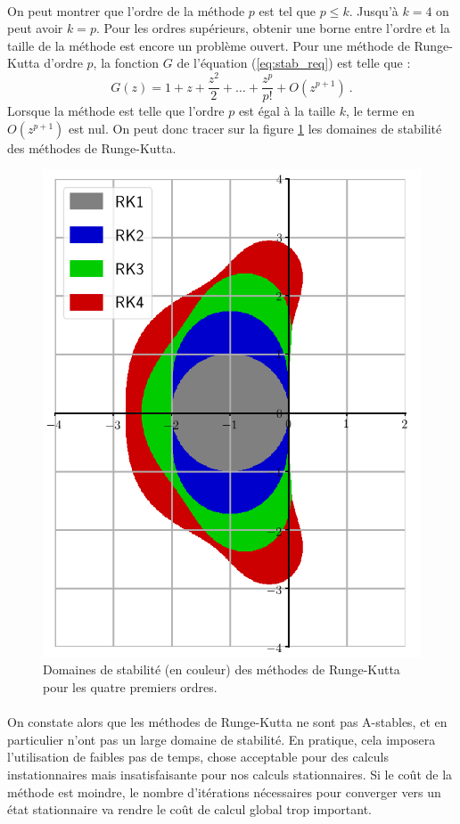     \paragraph{}
    On peut montrer que l'ordre de la méthode $p$ est tel que $p \leq k$.
    Jusqu'à $k = 4$ on peut avoir $k = p$.
    Pour les ordres supérieurs, obtenir une borne entre l'ordre et la taille de la méthode est encore un problème ouvert.
    Pour une méthode de Runge-Kutta d'ordre $p$, la fonction $G$ de l'équation (\ref{eq:stab_req}) est telle que \cite{HairerWanner1996}:
    \[G\left(z\right) = 1 + z + \frac{z^2}{2} + \dots + \frac{z^p}{p!} + O\left(z^{p+1}\right)\ .\]
    Lorsque la méthode est telle que l'ordre $p$ est égal à la taille $k$, le terme en $O\left(z^{p+1}\right)$ est nul.
    On peut donc tracer sur la figure \ref{fig:rk_stab} les domaines de stabilité des méthodes de Runge-Kutta.

    \begin{figure}
      \centering
      \includegraphics[width=.45\textwidth]{images/rk_stab.png}
      \caption{Domaines de stabilité (en couleur) des méthodes de Runge-Kutta pour les quatre premiers ordres.}
      \label{fig:rk_stab}
    \end{figure}

    \paragraph{}
    On constate alors que les méthodes de Runge-Kutta ne sont pas A-stables, et en particulier n'ont pas un large domaine de stabilité.
    En pratique, cela imposera l'utilisation de faibles pas de temps, chose acceptable pour des calculs instationnaires mais insatisfaisante pour nos calculs stationnaires.
    Si le coût de la méthode est moindre, le nombre d'itérations nécessaires pour converger vers un état stationnaire va rendre le coût de calcul global trop important.


